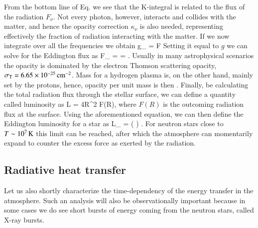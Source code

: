 From the bottom line of Eq.  we see that the K-integral is related to the flux of the radiation $F_{\nu}$.
Not every photon, however, interacts and collides with the matter, and hence the opacity correction $\kappa_{\nu}$ is also needed, representing effectively the fraction of radiation interacting with the matter.
If we now integrate over all the frequencies we obtain
\be
g_{} =  \kappa F
\ee
Setting it equal to $g$ we can solve for the Eddington flux as
\be
F_{} =   =  .
\ee
Usually in many astrophysical scenarios the opacity is dominated by the electron Thomson scattering opacity, $\sigma_{\mathrm{T}} = 6.65 \times 10^{-25} \, \mathrm{cm}^{-2}$.
Mass for a hydrogen plasma is, on the other hand, mainly set by the protons, hence, opacity per unit mass is then
\be
\kappa \approx {}.
\ee
Finally, be calculating the total radiation flux through the stellar surface, we can define a quantity called luminosity as
\be
L = 4\pi R^2 F(R),
\ee
where $F(R)$ is the outcoming radiation flux at the surface.
Using the aforementioned equation, we can then define the Eddington luminosity for a star as 
\be\label{eq:Ledd}
L_{} =  \approx {} \left(  \right) \ergs.
\ee
For neutron stars close to $T \sim 10^7 \, \mathrm{K}$ this limit can be reached, after which the atmosphere can momentarily expand to counter the excess force as exerted by the radiation.



\subsection{Radiative heat transfer}
Let us also shortly characterize the time-dependency of the energy transfer in the atmosphere.\cite[for a more in depth discussion, see][]{CM04, iZCT14}
Such an analysis will also be observationally important because in some cases we do see short bursts of energy coming from the neutron stars, called X-ray bursts.\cite[for a review, see e.g.,][]{LvPT93, GMH08}

